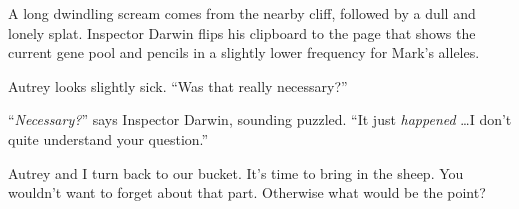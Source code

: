 {
 A long dwindling scream comes from the nearby cliff, followed by a
dull and lonely splat. Inspector Darwin flips his clipboard to the page
that shows the current gene pool and pencils in a slightly lower
frequency for Mark's alleles.}

{
 Autrey looks slightly sick. ``Was that really
necessary?''}

{
 ``\textit{Necessary?}'' says
Inspector Darwin, sounding puzzled. ``It just
\textit{happened} \ldots I don't quite understand your
question.''}

{
 Autrey and I turn back to our bucket. It's time to
bring in the sheep. You wouldn't want to forget about
that part. Otherwise what would be the point?}

\myendsectiontext



